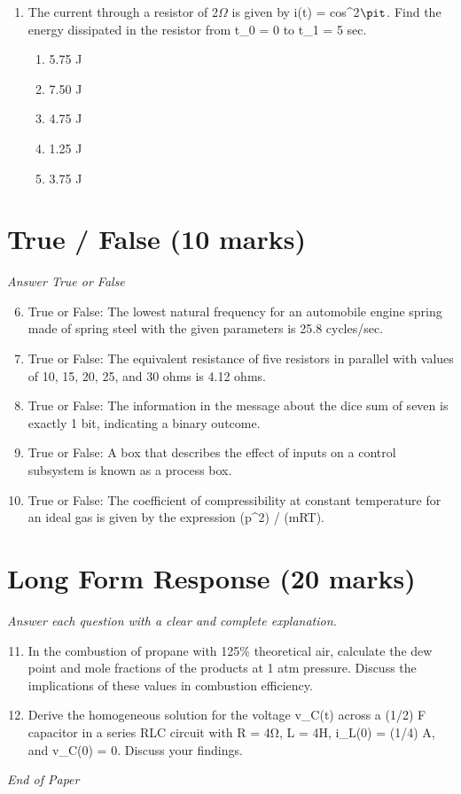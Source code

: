 \documentclass[12pt]{article}
\begin{document}
\begin{enumerate}[label=\arabic*.]
\begin{enumerate}[label=(\alph*)]
    \item delta winding
    \item closed winding
    \item parallel winding
    \item zigzag winding
\end{enumerate}
\item The current through a resistor of 2\ensuremath{\Omega} is given by i(t) = cos\^{}2\ensuremath{\pit}. Find the energy
dissipated in the resistor from t\_0 = 0 to t\_1 = 5 sec.
\begin{enumerate}[label=(\alph*)]
    \item 5.75 J
    \item 7.50 J
    \item 4.75 J
    \item 1.25 J
    \item 3.75 J
\end{enumerate}
\end{enumerate}

\section*{True / False (10 marks)}
\textit{Answer True or False}
\begin{enumerate}[label=\arabic*.]
\setcounter{enumi}{5}
\item True or False: The lowest natural frequency for an automobile engine spring made of spring steel with the given parameters is 25.8 cycles/sec.
\item True or False: The equivalent resistance of five resistors in parallel with values of 10, 15, 20, 25, and 30 ohms is 4.12 ohms.
\item True or False: The information in the message about the dice sum of seven is exactly 1 bit, indicating a binary outcome.
\item True or False: A box that describes the effect of inputs on a control subsystem is known as a process box.
\item True or False: The coefficient of compressibility at constant temperature for an ideal gas is given by the expression (p\^{}2) / (mRT).
\end{enumerate}

\section*{Long Form Response (20 marks)}
\textit{Answer each question with a clear and complete explanation.}
\begin{enumerate}[label=\arabic*.]
\setcounter{enumi}{10}
\item In the combustion of propane with 125\% theoretical air, calculate the dew point and mole
fractions of the products at 1 atm pressure. Discuss the implications of these values in
combustion efficiency.
\item Derive the homogeneous solution for the voltage v\_C(t) across a (1/2) F capacitor in a
series RLC circuit with R = 4Ω, L = 4H, i\_L(0) = (1/4) A, and v\_C(0) = 0. Discuss your
findings.
\end{enumerate}

\vfill
\noindent\textit{End of Paper}
\end{document}
